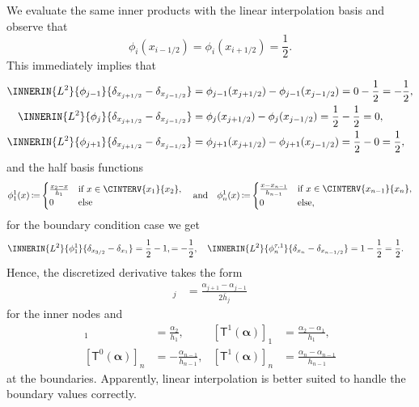\documentclass[a4paper]{paper}
\newcommand{\DISCOP}[1]{{\ensuremath{\mathsf{#1}}}}
\newcommand*{\DISCOPT}{\DISCOP{T}}
\DeclareMathOperator{\DEFEQ}{{\coloneqq}}
\newcommand*{\BDalpha}{\boldsymbol{\alpha}}
\begin{document}
We evaluate the same inner products with the linear interpolation basis and observe that
%
\begin{equation*}
 \phi_i(x_{i-1/2}) = \phi_i(x_{i+1/2}) = \frac{1}{2}.
\end{equation*}
%
This immediately implies that
%
\begin{align*}
 \INNERIN{L^2}{\phi_{j-1}}{\delta_{x_{j+1/2}} - \delta_{x_{j-1/2}}}
 &= \phi_{j-1}(x_{j+1/2}) - \phi_{j-1}(x_{j-1/2}) = 0 - \frac{1}{2} = -\frac{1}{2}, \\
 \INNERIN{L^2}{\phi_j}{\delta_{x_{j+1/2}} - \delta_{x_{j-1/2}}}
 &= \phi_j(x_{j+1/2}) - \phi_j(x_{j-1/2}) = \frac{1}{2} - \frac{1}{2} = 0, \\
 \INNERIN{L^2}{\phi_{j+1}}{\delta_{x_{j+1/2}} - \delta_{x_{j-1/2}}}
 &= \phi_{j+1}(x_{j+1/2}) - \phi_{j+1}(x_{j-1/2}) = \frac{1}{2} - 0 = \frac{1}{2},
\end{align*}
%
and the half basis functions
%
\begin{equation*}
 \phi_1^1(x) \DEFEQ
 \begin{cases}
  \frac{x_2 - x}{h_1} & \text{if } x \in \CINTERV{x_1}{x_2}, \\
  0 & \text{else}
 \end{cases} \quad \text{and} \quad
 \phi_n^1(x) \DEFEQ
 \begin{cases}
  \frac{x-x_{n-1}}{h_{n-1}} & \text{if } x \in \CINTERV{x_{n-1}}{x_n}, \\
  0 & \text{else},
 \end{cases}
\end{equation*}
%
for the boundary condition case we get 
%
\begin{align*}
 \INNERIN{L^2}{\phi^1_{1}}{\delta_{x_{3/2}} - \delta_{x_1}}
 = \frac{1}{2} - 1, = -\frac{1}{2}, \quad
 \INNERIN{L^2}{\phi^{\tau, 1}_{n}}{\delta_{x_{n}} - \delta_{x_{n-1/2}}}
 &= 1 - \frac{1}{2} = \frac{1}{2}.
\end{align*}
%
Hence, the discretized derivative takes the form
%
\begin{align*}
 [\DISCOPT(\BDalpha)]_j 
 &= \frac{\alpha_{j+1}  - \alpha_{j-1}}{2\bar h_j}
\end{align*}
%
for the inner nodes and
%
\begin{align*}
 [\DISCOPT^0(\BDalpha)]_1 
 &= \frac{\alpha_2}{h_1}, &
 [\DISCOPT^1(\BDalpha)]_1 
 &= \frac{\alpha_2 - \alpha_1}{h_1}, \\
 [\DISCOPT^0(\BDalpha)]_n
 &= -\frac{\alpha_{n-1}}{h_{n-1}}, &
 [\DISCOPT^1(\BDalpha)]_n
 &= \frac{\alpha_n - \alpha_{n-1}}{h_{n-1}}
\end{align*}
%
at the boundaries. Apparently, linear interpolation is better suited to handle the boundary values correctly.
\end{document}

